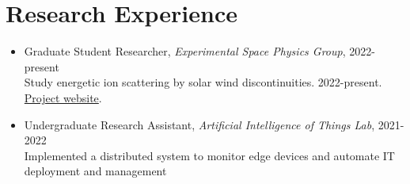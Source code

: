 \documentclass[
  letterpaper,
  DIV=11,
  numbers=noendperiod]{scrartcl}
\begin{document}
\section{Research Experience}\label{research-experience}

\begin{itemize}
\item
  Graduate Student Researcher, \emph{Experimental Space Physics Group}, 2022-present\\
  Study energetic ion scattering by solar wind discontinuities. 2022-present. \href{https://beforerr.github.io/ion_scattering_by_SWD}{Project website}.
\item
  Undergraduate Research Assistant, \emph{Artificial Intelligence of Things Lab}, 2021-2022\\
  Implemented a distributed system to monitor edge devices and automate IT deployment and management
\end{itemize}
\end{document}
